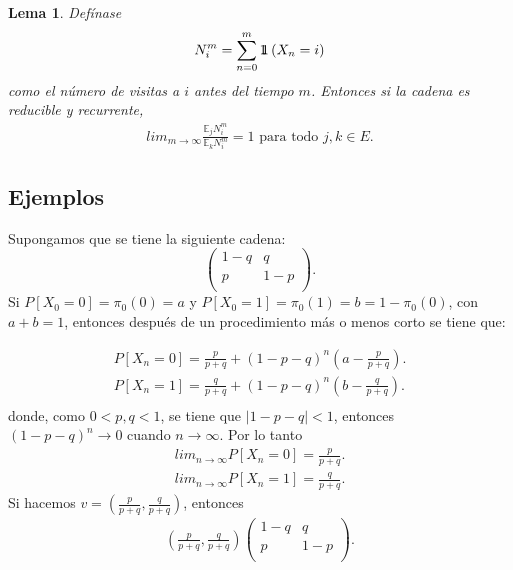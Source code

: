 \documentclass{article}
\newtheorem{Lema}{Lema}[section]
\newcommand{\esp}{\mathbb{E}}
\newcommand{\indora}{\mbox{$1$\hspace{-0.8ex}$1$}}
\numberwithin{equation}{section}
\begin{document}
\begin{Lema}
Def\'inase 
\begin{eqnarray}
N_{i}^{m}=\sum_{n=0}^{m}\indora\left(X_{n}=i\right)
\end{eqnarray} 
como el n\'umero de visitas a $i$ antes del tiempo $m$. Entonces si la cadena es reducible y recurrente, 
\begin{eqnarray}
lim_{m\rightarrow\infty}\frac{\esp_{j}N_{i}^{m}}{\esp_{k}N_{i}^{m}}=1\textrm{ para todo }j,k\in E.
\end{eqnarray}
\end{Lema}

%
\subsection*{Ejemplos}

Supongamos que se tiene la siguiente cadena:
\begin{equation}
\left(\begin{array}{cc}
1-q & q\\
p & 1-p\\
\end{array}
\right).
\end{equation}
Si $P\left[X_{0}=0\right]=\pi_{0}(0)=a$ y $P\left[X_{0}=1\right]=\pi_{0}(1)=b=1-\pi_{0}(0)$, con $a+b=1$, entonces despu\'es de un procedimiento m\'as o menos corto se tiene que:

\begin{eqnarray*}
P\left[X_{n}=0\right]=\frac{p}{p+q}+\left(1-p-q\right)^{n}\left(a-\frac{p}{p+q}\right).\\
P\left[X_{n}=1\right]=\frac{q}{p+q}+\left(1-p-q\right)^{n}\left(b-\frac{q}{p+q}\right).\\
\end{eqnarray*}
donde, como $0<p,q<1$, se tiene que $|1-p-q|<1$, entonces $\left(1-p-q\right)^{n}\rightarrow 0$ cuando $n\rightarrow\infty$. Por lo tanto
\begin{eqnarray*}
lim_{n\rightarrow\infty}P\left[X_{n}=0\right]=\frac{p}{p+q}.\\
lim_{n\rightarrow\infty}P\left[X_{n}=1\right]=\frac{q}{p+q}.
\end{eqnarray*}
Si hacemos $v=\left(\frac{p}{p+q},\frac{q}{p+q}\right)$, entonces
\begin{eqnarray*}
\left(\frac{p}{p+q},\frac{q}{p+q}\right)\left(\begin{array}{cc}
1-q & q\\
p & 1-p\\
\end{array}\right).
\end{eqnarray*}
\end{document}
